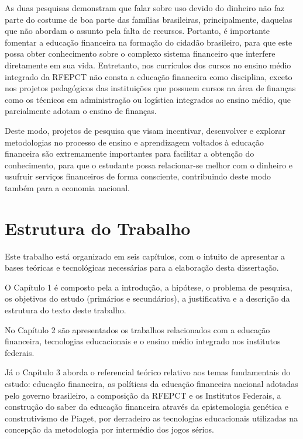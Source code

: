 \newpage
As duas pesquisas demonstram que falar sobre uso devido do dinheiro não faz parte do costume de boa parte das famílias brasileiras, principalmente, daquelas que não abordam o assunto pela falta de recursos. Portanto, é importante fomentar a educação financeira na formação do cidadão brasileiro, para que este possa obter conhecimento sobre o complexo sistema financeiro que interfere diretamente em sua vida. Entretanto, nos currículos dos cursos no ensino médio integrado da RFEPCT não consta a educação financeira como disciplina, exceto nos projetos pedagógicos das instituições que possuem cursos na área de finanças como os técnicos em administração ou logística integrados ao ensino médio, que parcialmente adotam o ensino de finanças.

Deste modo, projetos de pesquisa que visam incentivar, desenvolver e explorar metodologias no processo de ensino e aprendizagem voltados à educação financeira são extremamente importantes para facilitar a obtenção do conhecimento, para que o estudante possa relacionar-se melhor com o dinheiro e usufruir serviços financeiros de forma consciente, contribuindo deste modo também para a economia nacional.

\newpage

\section{Estrutura do Trabalho}
Este trabalho está organizado em seis capítulos, com o intuito de apresentar a bases teóricas e tecnológicas necessárias para a elaboração desta dissertação.

O Capítulo 1 é composto pela a introdução, a hipótese, o problema de pesquisa, os objetivos do estudo (primários e secundários), a justificativa e a descrição da estrutura do texto deste trabalho.

No Capítulo 2 são apresentados os trabalhos relacionados com a educação financeira, tecnologias educacionais e o ensino médio integrado nos institutos federais.

Já o Capítulo 3 aborda o referencial teórico relativo aos temas fundamentais do estudo: educação financeira, as políticas da educação financeira nacional adotadas pelo governo brasileiro, a composição da RFEPCT e os Institutos Federais, a construção do saber da educação financeira através da epistemologia genética e construtivismo de Piaget, por derradeiro as tecnologias educacionais utilizadas na concepção da metodologia por intermédio dos jogos sérios.

